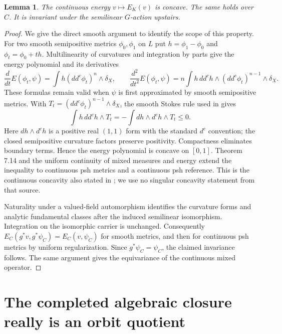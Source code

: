 \documentclass[11pt]{article}
\newtheorem{lemma}[theorem]{Lemma}
\theoremstyle{remark}
\newcommand{\ddc}{dd^c}
\begin{document}
\begin{lemma}\label{lem:concave}
The continuous energy $v\mapsto E_K(v)$ is concave. The same holds
over $C$. It is invariant under the semilinear $G$-action upstairs.
\end{lemma}
\begin{proof}
We give the direct smooth argument to identify the scope of this
property. For two smooth semipositive metrics $\phi_0,\phi_1$ on $L$
put $h=\phi_1-\phi_0$ and $\phi_t=\phi_0+th$. Multilinearity of
curvatures and integration by parts give the energy polynomial and
its derivatives
\[
 \frac d{dt}E(\phi_t,\psi)=\int h(\ddc\phi_t)^n\wedge\delta_X,
 \qquad
 \frac {d^2}{dt^2}E(\phi_t,\psi)
 =n\int h\,\ddc h\wedge(\ddc\phi_t)^{n-1}\wedge\delta_X.
\]
These formulas remain valid when $\psi$ is first approximated by
smooth semipositive metrics. With $T_t=(\ddc\phi_t)^{n-1}\wedge
\delta_X$, the smooth Stokes rule used in
\cite[Proposition 8.3(iii)]{BE} gives
\[
 \int h\,\ddc h\wedge T_t
 =-\int dh\wedge d^ch\wedge T_t\leq0.
\]
Here $dh\wedge d^ch$ is a positive real $(1,1)$ form with the
standard $d^c$ convention; the closed semipositive curvature factors
preserve positivity. Compactness eliminates boundary terms. Hence the
energy polynomial is concave on $[0,1]$. Theorem 7.14 and the uniform
continuity of mixed measures and energy extend the inequality to
continuous psh metrics and a continuous psh reference. This is the
continuous concavity also stated in \cite[Section 1.6]{BGM}; we use no
singular concavity statement from that source.

Naturality under a valued-field automorphism identifies the curvature
forms and analytic fundamental classes after the induced semilinear
isomorphism. Integration on the isomorphic carrier is unchanged.
Consequently $E_C(g^*v,g^*\psi_C)=E_C(v,\psi_C)$ for smooth metrics,
and then for continuous psh metrics by uniform regularization. Since
$g^*\psi_C=\psi_C$, the claimed invariance follows. The same argument
gives the equivariance of the continuous mixed operator.
\end{proof}

\section{The completed algebraic closure really is an orbit quotient}
\end{document}
